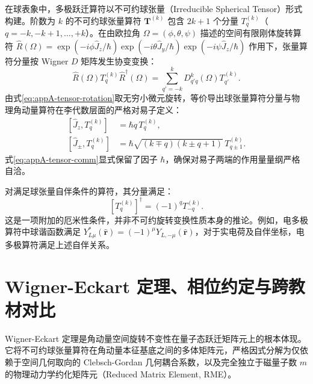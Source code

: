 在球表象中，多极跃迁算符以不可约球张量（Irreducible Spherical Tensor）形式构建。阶数为 $k$ 的不可约球张量算符 $\mathbf{T}^{(k)}$ 包含 $2k+1$ 个分量 $T_q^{(k)}$（$q = -k, -k+1, \dots, +k$）。在由欧拉角 $\Omega = (\phi, \theta, \psi)$ 描述的空间有限刚体旋转算符 $\hat{R}(\Omega) = \exp(-i \phi \hat{J}_z / \hbar) \exp(-i \theta \hat{J}_y / \hbar) \exp(-i \psi \hat{J}_z / \hbar)$ 作用下，张量算符分量按 Wigner $D$ 矩阵发生协变变换：
\begin{equation}\label{eq:appA-tensor-rotation}
\hat{R}(\Omega) T_q^{(k)} \hat{R}^\dagger(\Omega) = \sum_{q'=-k}^k D^k_{q' q}(\Omega) T_{q'}^{(k)} .
\end{equation}
由式\eqref{eq:appA-tensor-rotation}取无穷小微元旋转，等价导出球张量算符分量与物理角动量算符在李代数层面的严格对易子定义：
\begin{align}\label{eq:appA-tensor-comm}
[\hat{J}_z, T_q^{(k)}] &= \hbar q \, T_q^{(k)} , \\
[\hat{J}_\pm, T_q^{(k)}] &= \hbar \sqrt{(k \mp q)(k \pm q + 1)} \, T_{q \pm 1}^{(k)} .
\end{align}
式\eqref{eq:appA-tensor-comm}显式保留了因子 $\hbar$，确保对易子两端的作用量量纲严格自洽。

对满足球张量自伴条件的算符，其分量满足：
\begin{equation}\label{eq:appA-hermitian-tensor}
[T_q^{(k)}]^\dagger = (-1)^q T_{-q}^{(k)} .
\end{equation}
这是一项附加的厄米性条件，并非不可约旋转变换性质本身的推论。例如，电多极算符中球谐函数满足 $Y_{L\mu}^*(\hat{\mathbf{r}}) = (-1)^\mu Y_{L,-\mu}(\hat{\mathbf{r}})$，对于实电荷及自伴坐标，电多极算符满足上述自伴关系。

\section{Wigner-Eckart 定理、相位约定与跨教材对比}\label{sec:appA-2}

Wigner-Eckart 定理是角动量空间旋转不变性在量子态跃迁矩阵元上的根本体现。它将不可约球张量算符在角动量本征基底之间的多体矩阵元，严格因式分解为仅依赖于空间几何取向的 Clebsch-Gordan 几何耦合系数，以及完全独立于磁量子数 $m$ 的物理动力学约化矩阵元（Reduced Matrix Element, RME）。

